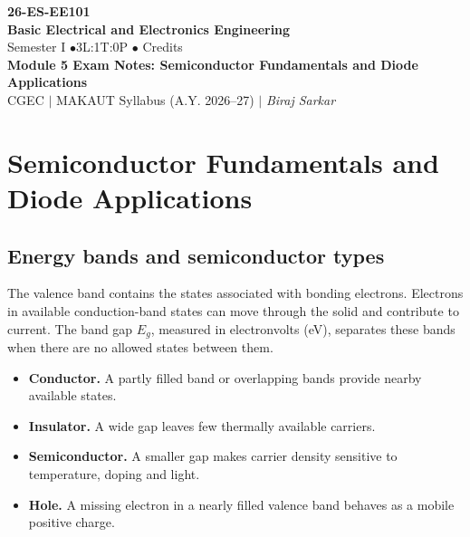 \documentclass[12pt,a4paper]{article}
\begin{document}
\begin{center}
  {\Large\bfseries\color{myred} 26-ES-EE101}\\[3pt]
  {\LARGE\bfseries\color{myred} Basic Electrical and Electronics Engineering}\\[5pt]
  {\normalsize\color{mydark} Semester I \quad$\bullet$\quad 3L:1T:0P \quad$\bullet$ Credits}\\[3pt]
  {\normalsize\color{myteal}\textbf{Module 5 Exam Notes: Semiconductor Fundamentals and Diode Applications}}\\[3pt]
  {\small\color{mydark} CGEC \;$|$\; MAKAUT Syllabus (A.Y. 2026--27) \;$|$\; \textit{Biraj Sarkar}}
\end{center}
\vspace{2pt}
\noindent{\color{myred}\rule{\linewidth}{1.5pt}}
\vspace{2pt}

\hypersetup{linkcolor=mydark}
\tableofcontents
\hypersetup{linkcolor=myteal}
\newpage

\section{Semiconductor Fundamentals and Diode Applications}

\subsection{Energy bands and semiconductor types}
\begin{tcolorbox}[defbox,title={Valence band, conduction band and band gap}]
The valence band contains the states associated with bonding electrons. Electrons in available conduction-band states can move through the solid and contribute to current. The band gap \(E_g\), measured in electronvolts (eV), separates these bands when there are no allowed states between them.
\end{tcolorbox}

\begin{itemize}[leftmargin=*, itemsep=3pt, topsep=4pt]
  \item \textbf{Conductor.} A partly filled band or overlapping bands provide nearby available states.
  \item \textbf{Insulator.} A wide gap leaves few thermally available carriers.
  \item \textbf{Semiconductor.} A smaller gap makes carrier density sensitive to temperature, doping and light.
  \item \textbf{Hole.} A missing electron in a nearly filled valence band behaves as a mobile positive charge.
\end{itemize}
\end{document}
